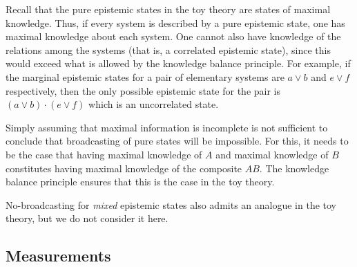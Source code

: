 \documentclass[pra,nofootinbib,showpacs,12pt]{revtex4}
\begin{document}
Recall that the pure epistemic states in the toy theory are states of
maximal knowledge. Thus, if every system is described by a pure epistemic
state, one has maximal knowledge about each system. One cannot also have
knowledge of the relations among the systems (that is, a correlated
epistemic state), since this would exceed what is allowed by the knowledge
balance principle. For example, if the marginal epistemic states for a pair
of elementary systems are $a\vee b$ and $e\vee f$ respectively, then the
only possible epistemic state for the pair is $(a\vee b)\cdot (e\vee f)$
which is an uncorrelated state.

Simply assuming that maximal information is incomplete is not sufficient to
conclude that broadcasting of pure states will be impossible. For this, it
needs to be the case that having maximal knowledge of $A$ and maximal
knowledge of $B$ constitutes having maximal knowledge of the composite $AB.$
The knowledge balance principle ensures that this is the case in the toy
theory.

No-broadcasting for \emph{mixed} epistemic states also admits an analogue in
the toy theory, but we do not consider it here.

\subsection{Measurements}

\label{measurements2}
\end{document}

